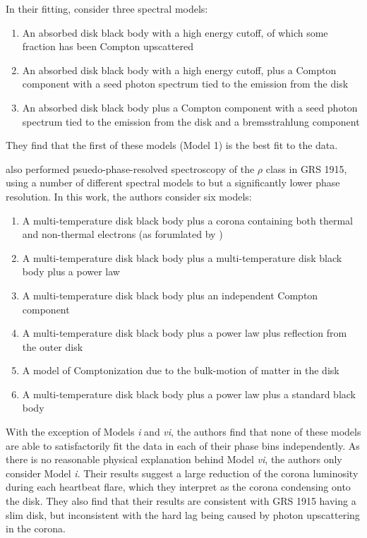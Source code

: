 \par In their fitting, \citealp{Neilsen_GRSModel} consider three spectral models:
\begin{enumerate}
\item An absorbed disk black body with a high energy cutoff, of which some fraction has been Compton upscattered
\item An absorbed disk black body with a high energy cutoff, plus a Compton component with a seed photon spectrum tied to the emission from the disk
\item An absorbed disk black body plus a Compton component with a seed photon spectrum tied to the emission from the disk and a bremsstrahlung component
\end{enumerate}
They find that the first of these models (Model 1) is the best fit to the data.
\par \citealp{Mineo_PhasRes} also performed psuedo-phase-resolved spectroscopy of the $\rho$ class in GRS 1915, using a number of different spectral models to \citealp{Neilsen_GRSModel} but a significantly lower phase resolution.  In this work, the authors consider six models:
\begin{enumerate}
\item A multi-temperature disk black body plus a corona containing both thermal and non-thermal electrons (as forumlated by \citealp{Poutanen_Hybrid})
\item A multi-temperature disk black body plus a multi-temperature disk black body plus a power law
\item A multi-temperature disk black body plus an independent Compton component
\item A multi-temperature disk black body plus a power law plus reflection from the outer disk
\item A model of Comptonization due to the bulk-motion of matter in the disk
\item A multi-temperature disk black body plus a power law plus a standard black body
\end{enumerate}
With the exception of Models \textit{i} and \textit{vi}, the authors find that none of these models are able to satisfactorily fit the data in each of their phase bins independently.  As there is no reasonable physical explanation behind Model \textit{vi}, the authors only consider Model \textit{i}.  Their results suggest a large reduction of the corona luminosity during each heartbeat flare, which they interpret as the corona condensing onto the disk.  They also find that their results are consistent with GRS 1915 having a slim disk, but inconsistent with the hard lag being caused by photon upscattering in the corona.
